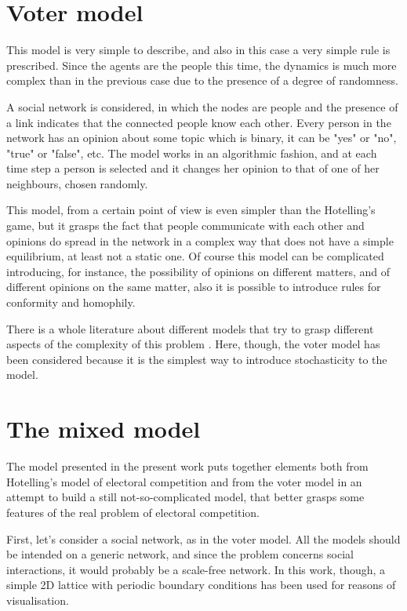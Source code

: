 \documentclass[11pt,a4paper,twocolumn]{article}
\begin{document}
\section{Voter model}
\vspace{-10pt}

This model is very simple to describe, and also in this case a very simple rule is prescribed. Since the agents are the people this time, the dynamics is much more complex than in the previous case due to the presence of a degree of randomness. 

A social network is considered, in which the nodes are people and the presence of a link indicates that the connected people know each other. Every person in the network has an opinion about some topic which is binary, it can be "yes" or "no", "true" or "false", etc. The model works in an algorithmic fashion, and at each time step a person is selected and it changes her opinion to that of one of her neighbours, chosen randomly.

This model, from a certain point of view is even simpler than the Hotelling's game, but it grasps the fact that people communicate with each other and opinions do spread in the network in a complex way that does not have a simple equilibrium, at least not a static one.
Of course this model can be complicated introducing, for instance, the possibility of opinions on different matters, and of different opinions on the same matter, also it is possible to introduce rules for conformity and homophily.

There is a whole literature about different models that try to grasp different aspects of the complexity of this problem \citep{Galam2002,Nowak1990,Deffuant2000,Hegselmann2002}. Here, though, the voter model has been considered because it is the simplest way to introduce stochasticity to the model.

\vspace{-15pt}
\section{The mixed model}
\vspace{-10pt}
The model presented in the present work puts together elements both from Hotelling's model of electoral competition and from the voter model in an attempt to build a still not-so-complicated model, that better grasps some features of the real problem of electoral competition.

First, let's consider a social network, as in the voter model. All the models should be intended on a generic network, and since the problem concerns social interactions, it would probably be a scale-free network. In this work, though, a simple 2D lattice with periodic boundary conditions has been used for reasons of visualisation. 
\end{document}
